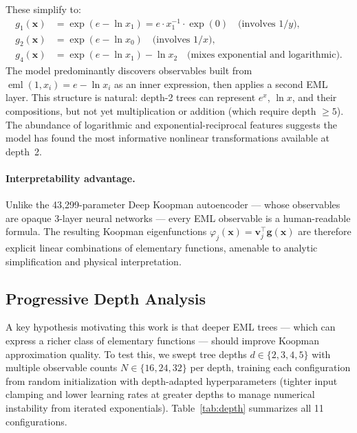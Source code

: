 \documentclass[11pt]{article}
\DeclareMathOperator{\eml}{eml}
\newcommand{\bx}{\mathbf{x}}
\newcommand{\bg}{\mathbf{g}}
\newcommand{\bv}{\mathbf{v}}
\begin{document}
\noindent
These simplify to:
\begin{align*}
  g_1(\bx) &= \exp(e - \ln x_1) = e \cdot x_1^{-1} \cdot \exp(0) \quad
    \text{(involves $1/y$)}, \\
  g_2(\bx) &= \exp(e - \ln x_0) \quad
    \text{(involves $1/x$)}, \\
  g_4(\bx) &= \exp(e - \ln x_1) - \ln x_2 \quad
    \text{(mixes exponential and logarithmic)}.
\end{align*}
The model predominantly discovers observables built from $\eml(1, x_i) = e - \ln x_i$
as an inner expression, then applies a second EML layer.  This structure is natural:
depth-2 trees can represent $e^x$, $\ln x$, and their compositions, but not
yet multiplication or addition (which require depth $\ge 5$).  The abundance of
logarithmic and exponential-reciprocal features suggests the model has found the
most informative nonlinear transformations available at depth~2.

\paragraph{Interpretability advantage.}
Unlike the 43{,}299-parameter Deep Koopman autoencoder --- whose observables are
opaque 3-layer neural networks --- every EML observable is a human-readable formula.
The resulting Koopman eigenfunctions $\varphi_j(\bx) = \bv_j^\top \bg(\bx)$ are
therefore explicit linear combinations of elementary functions, amenable to analytic
simplification and physical interpretation.


\subsection{Progressive Depth Analysis}
\label{sec:depth-analysis}

A key hypothesis motivating this work is that deeper EML trees --- which can express
a richer class of elementary functions --- should improve Koopman approximation
quality.  To test this, we swept tree depths $d \in \{2, 3, 4, 5\}$ with multiple
observable counts $N \in \{16, 24, 32\}$ per depth, training each configuration
from random initialization with depth-adapted hyperparameters (tighter input
clamping and lower learning rates at greater depths to manage numerical instability
from iterated exponentials).  Table~\ref{tab:depth} summarizes all 11
configurations.
\end{document}
